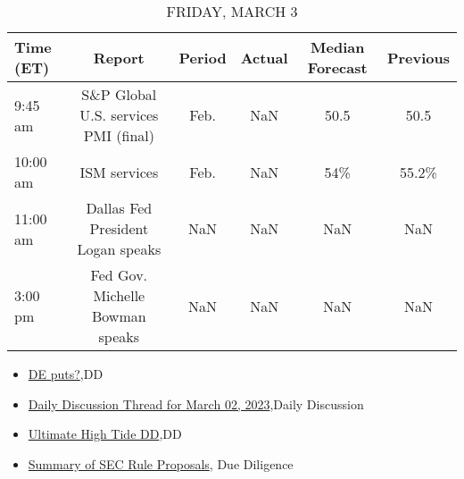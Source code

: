 \documentclass{article}%
\begin{document}
%


\begin{table}[htbp]%
\caption{FRIDAY, MARCH 3}%
\centering%
\begin{adjustbox}{width=1\textwidth}%
\begin{tabular}{lccccc}
\toprule
Time (ET) &                               Report & Period & Actual & Median Forecast & Previous \\
\midrule
  9:45 am & S\&P Global U.S. services PMI (final) &   Feb. &    NaN &            50.5 &     50.5 \\
 10:00 am &                         ISM services &   Feb. &    NaN &             54\% &    55.2\% \\
 11:00 am &    Dallas Fed President Logan speaks &    NaN &    NaN &             NaN &      NaN \\
  3:00 pm &      Fed Gov. Michelle Bowman speaks &    NaN &    NaN &             NaN &      NaN \\
\bottomrule
\end{tabular}
%
\end{adjustbox}%
\end{table}

%
\begin{itemize}%
\item%
\href{https://reddit.com/r/wallstreetbets/comments/11g1an5/de\_puts/}{DE puts?},DD%
\item%
\href{https://reddit.com/r/wallstreetbets/comments/11fzzpw/daily\_discussion\_thread\_for\_march\_02\_2023/}{Daily Discussion Thread for March 02, 2023},Daily Discussion%
\item%
\href{https://reddit.com/r/Baystreetbets/comments/11fag8t/ultimate\_high\_tide\_dd/}{Ultimate High Tide DD},DD%
\item%
\href{https://reddit.com/r/Superstonk/comments/11g00ov/summary\_of\_sec\_rule\_proposals/}{Summary of SEC Rule Proposals}, Due Diligence%
\end{itemize}%
\end{document}
